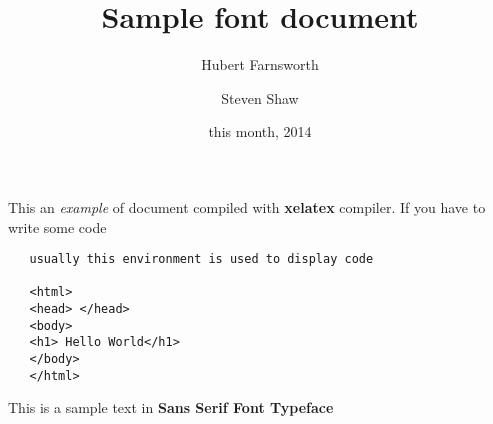 \documentclass[14pt]{article}
\title{Sample font document}
\author{Hubert Farnsworth}
\author{Steven Shaw}
\date{this month, 2014}
\begin{document}
  \maketitle

   This an \textit{example} of document compiled with
   \textbf{xelatex} compiler. If you have to write
   some code

   \begin{verbatim}
   usually this environment is used to display code

   <html>
   <head> </head>
   <body>
   <h1> Hello World</h1>
   </body>
   </html>
   \end{verbatim}

  {\sffamily This is a sample text in \textbf{Sans Serif Font Typeface}}
\end{document}
